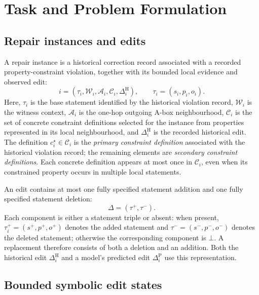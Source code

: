 \documentclass[a4paper,UKenglish,cleveref,autoref,thm-restate]{tgdk-v2021}
\newcommand{\histedit}{\Delta^{\mathrm{H}}}
\newcommand{\prededit}{\Delta^{\mathrm{P}}}
\newcommand{\witnessctx}{\mathcal{W}}
\begin{document}
\section{Task and Problem Formulation}
\label{sec:task}

\subsection{Repair instances and edits}
\label{sec:task:instance}
A repair instance is a historical correction record associated with a recorded property-constraint violation, together with its bounded local evidence and observed edit:
\[
i=(\tau_i,\witnessctx_i,\mathcal{A}_i,\mathcal{C}_i,\histedit_i),
\qquad
\tau_i=(s_i,p_i,o_i).
\]
Here, \(\tau_i\) is the base statement identified by the historical violation record, \(\witnessctx_i\) is the witness context, \(\mathcal{A}_i\) is the one-hop outgoing A-box neighbourhood, \(\mathcal{C}_i\) is the set of concrete constraint definitions selected for the instance from properties represented in its local neighbourhood, and \(\histedit_i\) is the recorded historical edit. The definition \(c_i^\star\in\mathcal{C}_i\) is the \emph{primary constraint definition} associated with the historical violation record; the remaining elements are \emph{secondary constraint definitions}. Each concrete definition appears at most once in \(\mathcal{C}_i\), even when its constrained property occurs in multiple local statements.

\label{sec:task:action}
An edit contains at most one fully specified statement addition and one fully specified statement deletion:
\[
\Delta=(\tau^+,\tau^-).
\]
Each component is either a statement triple or absent: when present, \(\tau_i^+=(s^+,p^+,o^+)\) denotes the added statement and \(\tau^-=(s^-,p^-,o^-)\) denotes the deleted statement; otherwise the corresponding component is \(\bot\). A replacement therefore consists of both a deletion and an addition. Both the historical edit \(\histedit_i\) and a model's predicted edit \(\prededit_i\) use this representation.

\subsection{Bounded symbolic edit states}
\label{subsec:symbolic-states}
\end{document}
